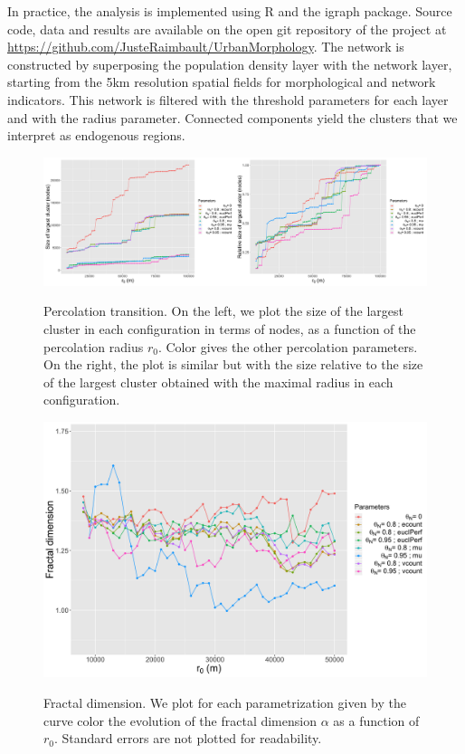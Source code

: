 \documentclass{jimis-en}
\begin{document}
In practice, the analysis is implemented using R and the igraph package. Source code, data and results are available on the open git repository of the project at \url{https://github.com/JusteRaimbault/UrbanMorphology}. The network is constructed by superposing the population density layer with the network layer, starting from the 5km resolution spatial fields for morphological and network indicators. This network is filtered with the threshold parameters for each layer and with the radius parameter. Connected components yield the clusters that we interpret as endogenous regions.



\begin{figure}[!ht] 
  {\includegraphics[width=\linewidth]{Fig2.png}}
  \centering
  \caption{Percolation transition. On the left, we plot the size of the largest cluster in each configuration in terms of nodes, as a function of the percolation radius $r_0$. Color gives the other percolation parameters. On the right, the plot is similar but with the size relative to the size of the largest cluster obtained with the maximal radius in each configuration.\label{fig:percolation}}
\end{figure}

\begin{figure}[!ht] 
  {\includegraphics[width=\linewidth]{Fig3.png}}
  \centering
  \caption{Fractal dimension. We plot for each parametrization given by the curve color the evolution of the fractal dimension $\alpha$ as a function of $r_0$. Standard errors are not plotted for readability.\label{fig:fractaldim}}
\end{figure}
\end{document}
